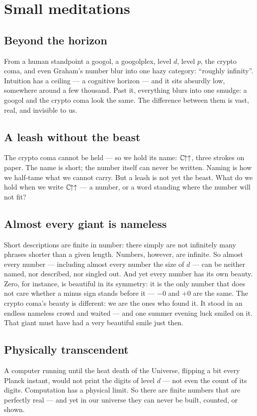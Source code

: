 \section{Small meditations}

\subsection{Beyond the horizon}
From a human standpoint a googol, a googolplex, level \(d\), level \(p\), the crypto coma,
and even Graham's number blur into one hazy category: ``roughly infinity''. Intuition has a
ceiling --- a cognitive horizon --- and it sits absurdly low, somewhere around a few
thousand. Past it, everything blurs into one smudge: a googol and the crypto coma look the same. The difference between them is vast, real, and
invisible to us.

\subsection{A leash without the beast}
The crypto coma cannot be held --- so we hold its name: \(\mathbb{C}\mkern-1.5mu{\uparrow\uparrow}\), three strokes on paper.
The name is short; the number itself can never be written. Naming is how we half-tame what
we cannot carry. But a leash is not yet the beast. What do we hold when we write \(\mathbb{C}\mkern-1.5mu{\uparrow\uparrow}\) --- a number, or a
word standing where the number will not fit?

\subsection{Almost every giant is nameless}
Short descriptions are finite in number: there simply are not infinitely many phrases
shorter than a given length. Numbers, however, are infinite. So almost every number ---
including almost every number the size of \(d\) --- can be neither named, nor described, nor
singled out. And yet every number has its own beauty. Zero, for instance, is beautiful in its
symmetry: it is the only number that does not care whether a minus sign stands before it ---
\(-0\) and \(+0\) are the same. The crypto coma's beauty is different: we are the ones who
found it. It stood in an endless nameless crowd and waited --- and one summer evening luck
smiled on it. That giant must have had a very beautiful smile just then.

\subsection{Physically transcendent}
A computer running until the heat death of the Universe, flipping a bit every Planck
instant, would not print the digits of level \(d\) --- not even the count of its digits.
Computation has a physical limit. So there are finite numbers that are perfectly real ---
and yet in our universe they can never be built, counted, or shown.

